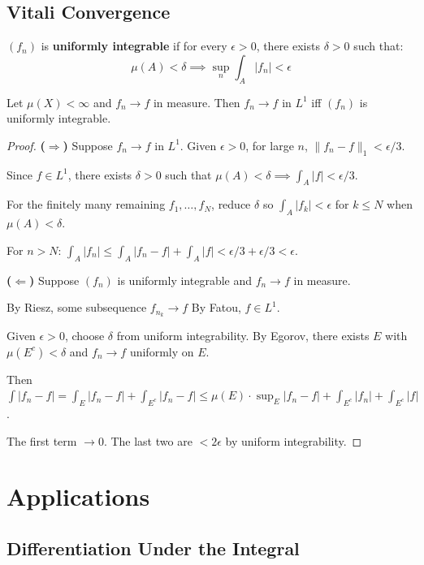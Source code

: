 \section{Vitali Convergence}

\begin{definition}
$(f_n)$ is \textbf{uniformly integrable} if for every $\epsilon > 0$, there exists $\delta > 0$ such that:
\[ \mu(A) < \delta \implies \sup_n \int_A |f_n| < \epsilon \]
\end{definition}

\begin{theorem}[Vitali]
Let $\mu(X) < \infty$ and $f_n \to f$ in measure. Then $f_n \to f$ in $L^1$ iff $(f_n)$ is uniformly integrable.
\end{theorem}

\begin{proof}
\textbf{($\Rightarrow$)} Suppose $f_n \to f$ in $L^1$. Given $\epsilon > 0$, for large $n$, $\|f_n - f\|_1 < \epsilon/3$.

Since $f \in L^1$, there exists $\delta > 0$ such that $\mu(A) < \delta \implies \int_A |f| < \epsilon/3$.

For the finitely many remaining $f_1, \ldots, f_N$, reduce $\delta$ so $\int_A |f_k| < \epsilon$ for $k \leq N$ when $\mu(A) < \delta$.

For $n > N$: $\int_A |f_n| \leq \int_A |f_n - f| + \int_A |f| < \epsilon/3 + \epsilon/3 < \epsilon$.

\textbf{($\Leftarrow$)} Suppose $(f_n)$ is uniformly integrable and $f_n \to f$ in measure.

By Riesz, some subsequence $f_{n_k} \to f$ \almosteverywhere{} By Fatou, $f \in L^1$.

Given $\epsilon > 0$, choose $\delta$ from uniform integrability. By Egorov, there exists $E$ with $\mu(E^c) < \delta$ and $f_n \to f$ uniformly on $E$.

Then $\int |f_n - f| = \int_E |f_n - f| + \int_{E^c} |f_n - f| \leq \mu(E) \cdot \sup_E |f_n - f| + \int_{E^c} |f_n| + \int_{E^c} |f|$.

The first term $\to 0$. The last two are $< 2\epsilon$ by uniform integrability.
\end{proof}


\chapter{Applications}

\section{Differentiation Under the Integral}

